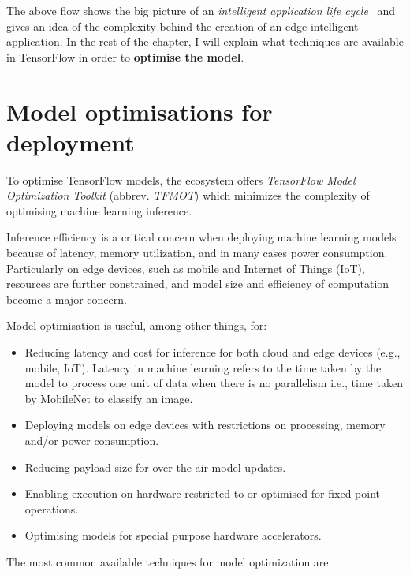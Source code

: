 The above flow shows the big picture of an \textit{intelligent application life
cycle}~\cite{tflite:intro} and gives an idea of the complexity behind the
creation of an edge intelligent application.
In the rest of the chapter, I will explain what techniques are available in
TensorFlow in order to \textbf{optimise the model}.

\section{Model optimisations for deployment}\label{sec:MO}

To optimise TensorFlow models, the ecosystem offers \textit{TensorFlow Model
Optimization Toolkit} (abbrev. \textit{TFMOT}) which minimizes the complexity
of optimising machine learning inference.

Inference efficiency is a critical concern when deploying machine learning
models because of latency, memory utilization, and in many cases power
consumption. Particularly on edge devices, such as mobile and Internet of
Things (IoT), resources are further constrained, and model size and efficiency
of computation become a major concern.

Model optimisation is useful, among other things, for:

\begin{itemize}
    \item Reducing latency and cost for inference for both cloud and edge
        devices (e.g., mobile, IoT).
        Latency in machine learning refers to the time taken by the model to
        process one unit of data when there is no parallelism i.e., time taken
        by MobileNet to classify an image.
    \item Deploying models on edge devices with restrictions on processing,
        memory and/or power-consumption.
    \item Reducing payload size for over-the-air model updates.
    \item Enabling execution on hardware restricted-to or optimised-for
        fixed-point operations.
    \item Optimising models for special purpose hardware accelerators.
\end{itemize}

The most common available techniques for model optimization are:

